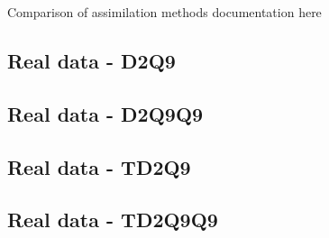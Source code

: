 \documentclass[class=article, crop=false]{standalone}
\begin{document}
Comparison of assimilation methods documentation here



\subsection{Real data - D2Q9}

\subsection{Real data - D2Q9Q9}

\subsection{Real data - TD2Q9}

\subsection{Real data - TD2Q9Q9}
\end{document}
